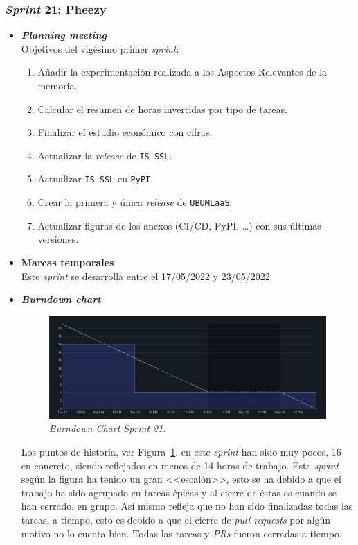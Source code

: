 \subsubsection{\textit{Sprint} 21: Pheezy}
\begin{itemize}
\item \textbf{\textit{Planning meeting}}\\
Objetivos del vigésimo primer \textit{sprint}:
\begin{enumerate}
\item Añadir la experimentación realizada a los Aspectos Relevantes de la memoria.
\item Calcular el resumen de horas invertidas por tipo de tareas.
\item Finalizar el estudio económico con cifras.
\item Actualizar la \textit{release} de \texttt{IS-SSL}.
\item Actualizar \texttt{IS-SSL} en \texttt{PyPI}.
\item Crear la primera y única \textit{release} de \texttt{UBUMLaaS}.
\item Actualizar figuras de los anexos (CI/CD, PyPI, \dots) con sus últimas versiones.
\end{enumerate}

\item \textbf{Marcas temporales}\\
Este \textit{sprint} se desarrolla entre el 17/05/2022 y 23/05/2022.

\item \textbf{\textit{Burndown chart}}\\
\begin{figure}
\begin{center}
\includegraphics[width=\textwidth]{../img/anexos/sprints/BD-Sprint21}
\caption{\textit{Burndown Chart Sprint 21.}}\label{fig:BD-Sprint21}
\end{center}
\end{figure}
Los puntos de historia, ver Figura~\ref{fig:BD-Sprint21}, en este \textit{sprint} han sido muy pocos, 16 en concreto, siendo reflejados en menos de 14 horas de trabajo. Este \textit{sprint} según la figura ha tenido un gran <<escalón>>, esto se ha debido a que el trabajo ha sido agrupado en tareas épicas y al cierre de éstas es cuando se han cerrado, en grupo. Así mismo refleja que no han sido finalizadas todas las tareas, a tiempo, esto es debido a que el cierre de \textit{pull requests} por algún motivo no lo cuenta bien. Todas las tareas y \textit{PRs} fueron cerradas a tiempo.


\end{itemize}
